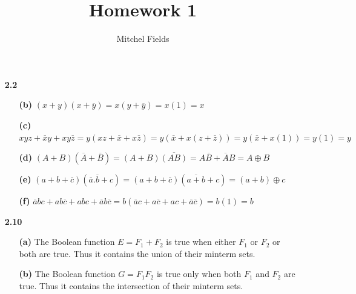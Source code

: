 \documentclass{article}
\title{Homework 1}
\author{Mitchel Fields}
\begin{document}
\maketitle
\begin{itemize}

	\item [\textbf{2.2}]
	\begin{itemize}
		\item [\textbf{(b)}] $(x + y) (x + \overline{y}) = x(y + \overline{y}) = x(1) = x$
		\item [\textbf{(c)}] $xyz + \overline{x}y + xy\overline{z} = y(xz + \overline{x} + x\overline{z}) = y(\overline{x} + x(z + \overline{z})) = y(\overline{x} + x(1)) = y(1) = y$
		\item [\textbf{(d)}] $(A + B)(\overline{A} + \overline{B}) = (A + B)\overline{(AB)} = A\overline{B} + \overline{A}B = A \oplus B$
		\item [\textbf{(e)}] $(a + b + \overline{c})(\overline{a}.\overline{b} + c) = (a + b + \overline{c})(\overline{a + b} + c) = (a + b) \oplus c$
		\item [\textbf{(f)}] $\overline{a}bc + ab\overline{c} + abc + \overline{a}b\overline{c} = b(\overline{a}c + a\overline{c} + ac + \overline{a}\overline{c}) = b(1) = b$
	\end{itemize}

	\item [\textbf{2.10}]
	\begin{itemize}
		\item [\textbf{(a)}] The Boolean function $E = F_1 + F_2$ is true when either $F_1$ or $F_2$ or both are true. Thus it contains the union of their minterm sets.
		\item [\textbf{(b)}] The Boolean function $G = F_1F_2$ is true only when both $F_1$ and $F_2$ are true. Thus it contains the intersection of their minterm sets.
	\end{itemize}


\end{itemize}
\end{document}
